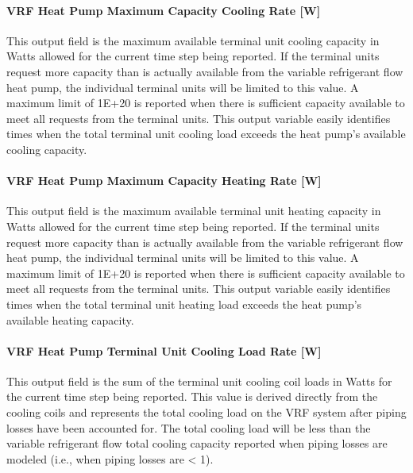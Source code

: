 \paragraph{VRF Heat Pump Maximum Capacity Cooling Rate {[}W{]}}\label{vrf-heat-pump-maximum-capacity-cooling-rate-w}

This output field is the maximum available terminal unit cooling capacity in Watts allowed for the current time step being reported. If the terminal units request more capacity than is actually available from the variable refrigerant flow heat pump, the individual terminal units will be limited to this value. A maximum limit of 1E+20 is reported when there is sufficient capacity available to meet all requests from the terminal units. This output variable easily identifies times when the total terminal unit cooling load exceeds the heat pump's available cooling capacity.

\paragraph{VRF Heat Pump Maximum Capacity Heating Rate {[}W{]}}\label{vrf-heat-pump-maximum-capacity-heating-rate-w}

This output field is the maximum available terminal unit heating capacity in Watts allowed for the current time step being reported. If the terminal units request more capacity than is actually available from the variable refrigerant flow heat pump, the individual terminal units will be limited to this value. A maximum limit of 1E+20 is reported when there is sufficient capacity available to meet all requests from the terminal units. This output variable easily identifies times when the total terminal unit heating load exceeds the heat pump's available heating capacity.

\paragraph{VRF Heat Pump Terminal Unit Cooling Load Rate {[}W{]}}\label{vrf-heat-pump-terminal-unit-cooling-load-rate-w}

This output field is the sum of the terminal unit cooling coil loads in Watts for the current time step being reported. This value is derived directly from the cooling coils and represents the total cooling load on the VRF system after piping losses have been accounted for. The total cooling load will be less than the variable refrigerant flow total cooling capacity reported when piping losses are modeled (i.e., when piping losses are \textless{} 1).

